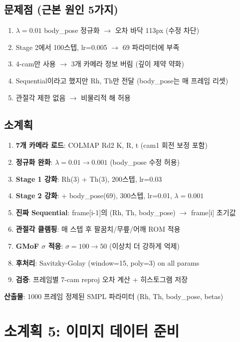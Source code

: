 \documentclass[11pt, a4paper]{report}
\begin{document}
\subsection{문제점 (근본 원인 5가지)}
\begin{enumerate}
\item $\lambda=0.01$ body\_pose 정규화 $\to$ 오차 바닥 113px (수정 차단)
\item Stage 2에서 100스텝, lr=0.005 $\to$ 69 파라미터에 부족
\item 4-cam만 사용 $\to$ 3개 카메라 정보 버림 (깊이 제약 약화)
\item Sequential이라고 했지만 Rh, Th만 전달 (body\_pose는 매 프레임 리셋)
\item 관절각 제한 없음 $\to$ 비물리적 해 허용
\end{enumerate}

\subsection{소계획}
\begin{pipelinebox}[title={SP-4: 7-View Sequential Reproj Fitting 스크립트}]
\begin{enumerate}
\item \textbf{7개 카메라 로드}: COLMAP Rd2 K, R, t (cam1 회전 보정 포함)
\item \textbf{정규화 완화}: $\lambda = 0.01 \to 0.001$ (body\_pose 수정 허용)
\item \textbf{Stage 1 강화}: Rh(3) + Th(3), 200스텝, lr=0.03
\item \textbf{Stage 2 강화}: + body\_pose(69), 300스텝, lr=0.01, $\lambda=0.001$
\item \textbf{진짜 Sequential}: frame[i-1]의 (Rh, Th, body\_pose) $\to$ frame[i] 초기값
\item \textbf{관절각 클램핑}: 매 스텝 후 팔꿈치/무릎/어깨 ROM 적용
\item \textbf{GMoF $\sigma$ 적응}: $\sigma = 100 \to 50$ (이상치 더 강하게 억제)
\item \textbf{후처리}: Savitzky-Golay (window=15, poly=3) on all params
\item \textbf{검증}: 프레임별 7-cam reproj 오차 계산 + 히스토그램 저장
\end{enumerate}
\textbf{산출물}: 1000 프레임 정제된 SMPL 파라미터 (Rh, Th, body\_pose, betas)
\end{pipelinebox}


\section{소계획 5: 이미지 데이터 준비}
\label{sec:sp5}
\end{document}
